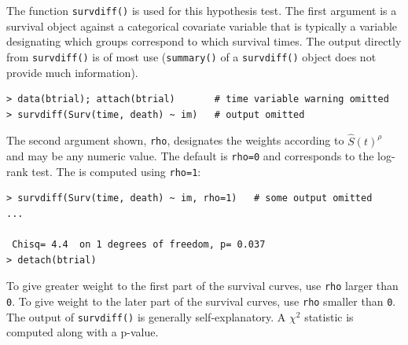 \documentclass[11pt]{article}
\begin{document}
The function \texttt{survdiff()} is used for this hypothesis test. The first argument is a survival object against a categorical covariate variable that is typically a variable designating which groups correspond to which survival times. The output directly from \texttt{survdiff()} is of most use (\texttt{summary()} of a \texttt{survdiff()} object does not provide much information).
\begin{verbatim}
> data(btrial); attach(btrial)       # time variable warning omitted
> survdiff(Surv(time, death) ~ im)   # output omitted
\end{verbatim}
The second argument shown, \texttt{rho}, designates the weights according to $\hat{S}(t)^\rho$ and may be any numeric value. The default is \texttt{rho=0} and corresponds to the log-rank test. The  is computed using \texttt{rho=1}:
\begin{verbatim}
> survdiff(Surv(time, death) ~ im, rho=1)   # some output omitted
...

 Chisq= 4.4  on 1 degrees of freedom, p= 0.037 
> detach(btrial)
\end{verbatim}
To give greater weight to the first part of the survival curves, use \texttt{rho} larger than \texttt{0}. To give weight to the later part of the survival curves, use \texttt{rho} smaller than \texttt{0}. The output of \texttt{survdiff()} is generally self-explanatory. A $\chi^2$ statistic is computed along with a p-value.

\pagebreak

{} \vspace{-1mm} \par
{}
\label{coxPHConstCov}
\end{document}
